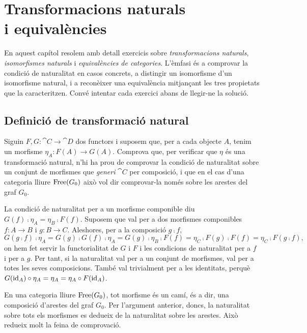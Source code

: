 \chapter[Transformacions naturals]{\texorpdfstring{Transformacions naturals\\ i equivalències}{Transformacions naturals i equivalències}}

En aquest capítol resolem amb detall exercicis sobre \emph{transformacions naturals}, \emph{isomorfismes naturals} i \emph{equivalències de categories}. L'èmfasi és a comprovar la condició de naturalitat en casos concrets, a distingir un isomorfisme d'un isomorfisme natural, i a reconèixer una equivalència mitjançant les tres propietats que la caracteritzen. Convé intentar cada exercici abans de llegir-ne la solució.

\section{Definició de transformació natural}

\begin{exercici}
Siguin $F,G\colon\cat{C}\to\cat{D}$ dos functors i suposem que, per a cada objecte $A$, tenim un morfisme $\eta_A\colon F(A)\to G(A)$. Comprova que, per verificar que $\eta$ és una transformació natural, n'hi ha prou de comprovar la condició de naturalitat sobre un conjunt de morfismes que \emph{generi} $\cat{C}$ per composició, i que en el cas d'una categoria lliure $\operatorname{Free}(G_0)$ això vol dir comprovar-la només sobre les arestes del graf $G_0$.
\end{exercici}

\begin{solucio}
La condició de naturalitat per a un morfisme componible diu $G(f)\comp\eta_A=\eta_B\comp F(f)$. Suposem que val per a dos morfismes componibles $f\colon A\to B$ i $g\colon B\to C$. Aleshores, per a la composició $g\comp f$,
\[
G(g\comp f)\comp\eta_A=G(g)\comp G(f)\comp\eta_A=G(g)\comp\eta_B\comp F(f)=\eta_C\comp F(g)\comp F(f)=\eta_C\comp F(g\comp f),
\]
on hem fet servir la functorialitat de $G$ i $F$ i les condicions de naturalitat per a $f$ i per a $g$. Per tant, si la naturalitat val per a un conjunt de morfismes, val per a totes les seves composicions. També val trivialment per a les identitats, perquè $G(\operatorname{id}_A)\circ\eta_A=\eta_A=\eta_A\circ F(\operatorname{id}_A)$.

En una categoria lliure $\operatorname{Free}(G_0)$, tot morfisme és un camí, és a dir, una composició d'arestes del graf $G_0$. Per l'argument anterior, doncs, la naturalitat sobre tots els morfismes es dedueix de la naturalitat sobre les arestes. Això redueix molt la feina de comprovació.
\end{solucio}


